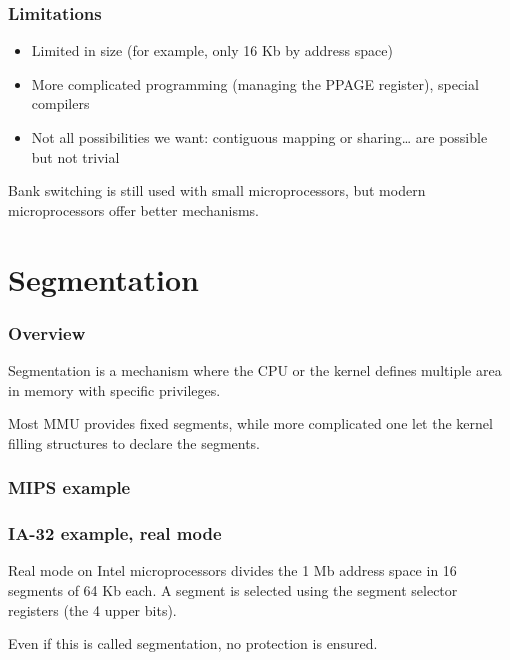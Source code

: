 
\begin{frame}
  \frametitle{Limitations}

  \begin{itemize}
  \item
    Limited in size (for example, only 16 Kb by address space)
  \item
    More complicated programming (managing the PPAGE register),
    special compilers
  \item
    Not all possibilities we want: contiguous mapping or
    sharing\ldots{} are possible but not trivial
  \end{itemize}

  \-

  Bank switching is still used with small microprocessors, but modern
  microprocessors offer better mechanisms.

\end{frame}

%
%

\section{Segmentation}


\begin{frame}
  \frametitle{Overview}

  Segmentation is a mechanism where the CPU or the kernel defines
  multiple area in memory with specific privileges.

  \-

  Most MMU provides fixed segments, while more complicated one let the
  kernel filling structures to declare the segments.

\end{frame}


\begin{frame}
  \frametitle{MIPS example}

  \begin{center}
  \end{center}

\end{frame}


\begin{frame}
  \frametitle{IA-32 example, real mode}

  Real mode on Intel microprocessors divides the 1 Mb address space in
  16 segments of 64 Kb each. A segment is selected using the segment
  selector registers (the 4 upper bits).

  \-

  Even if this is called segmentation, no protection is ensured.

\end{frame}

